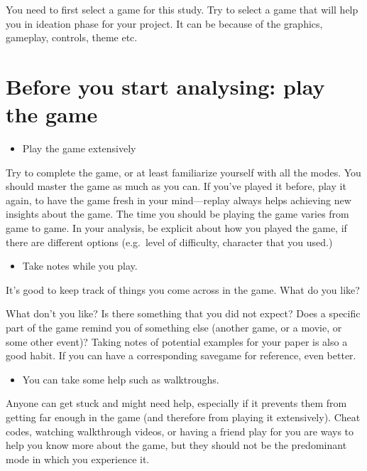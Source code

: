 \documentclass[
]{book}
\providecommand{\tightlist}{%
  \setlength{\itemsep}{0pt}\setlength{\parskip}{0pt}}
\begin{document}
You need to first select a game for this study. Try to select a game that will help you in ideation phase for your project.
It can be because of the graphics, gameplay, controls, theme etc.

\hypertarget{before-you-start-analysing-play-the-game}{%
\section{Before you start analysing: play the game}\label{before-you-start-analysing-play-the-game}}

\begin{itemize}
\tightlist
\item
  Play the game extensively
\end{itemize}

Try to complete the game, or at least familiarize yourself with all the modes. You
should master the game as much as you can. If you've played it before, play it
again, to have the game fresh in your mind---replay always helps achieving new
insights about the game. The time you should be playing the game varies from
game to game. In your analysis, be explicit about how you played the game, if
there are different options (e.g.~level of difficulty, character that you used.)

\begin{itemize}
\tightlist
\item
  Take notes while you play.
\end{itemize}

It's good to keep track of things you come across in the game. What do you like?

What don't you like? Is there something that you did not expect? Does a specific
part of the game remind you of something else (another game, or a movie, or
some other event)? Taking notes of potential examples for your paper is also a
good habit. If you can have a corresponding savegame for reference, even better.

\begin{itemize}
\tightlist
\item
  You can take some help such as walktroughs.
\end{itemize}

Anyone can get stuck and might need help, especially if it prevents them from
getting far enough in the game (and therefore from playing it extensively). Cheat
codes, watching walkthrough videos, or having a friend play for you are ways to
help you know more about the game, but they should not be the predominant
mode in which you experience it.
\end{document}
